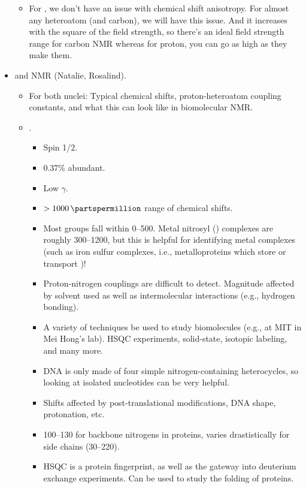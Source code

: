 \documentclass[../notes.tex]{subfiles}
\begin{document}
\begin{itemize}
\begin{itemize}
\begin{itemize}
        \end{itemize}
        \item For , we don't have an issue with chemical shift anisotropy. For almost any heteroatom (and carbon), we will have this issue. And it increases with the square of the field strength, so there's an ideal field strength range for carbon NMR whereas for proton, you can go as high as they make them.
    \end{itemize}
    \item {} and  NMR (Natalie, Rosalind).
    \begin{itemize}
        \item For both nuclei: Typical chemical shifts, proton-heteroatom coupling constants, and what this can look like in biomolecular NMR.
        \item {}.
        \begin{itemize}
            \item Spin 1/2.
            \item 0.37\% abundant.
            \item Low $\gamma$.
            \item $>\SI{1000}{\partspermillion}$ range of chemical shifts.
            \item Most groups fall within \SIrange{0}{500}{\partspermillion}. Metal nitrosyl () complexes are roughly \SIrange{300}{1200}{\partspermillion}, but this is helpful for identifying metal complexes (such as iron sulfur complexes, i.e., metalloproteins which store or transport )!
            \item Proton-nitrogen couplings are difficult to detect. Magnitude affected by solvent used as well as intermolecular interactions (e.g., hydrogen bonding).
            \item A variety of techniques be used to study biomolecules (e.g., at MIT in Mei Hong's lab). HSQC experiments, solid-state, isotopic labeling, and many more.
            \item DNA is only made of four simple nitrogen-containing heterocycles, so looking at isolated nucleotides can be very helpful.
            \item Shifts affected by post-translational modifications, DNA shape, protonation, etc.
            \item \SIrange{100}{130}{\partspermillion} for backbone nitrogens in proteins, varies drastistically for side chains (\SIrange{30}{220}{\partspermillion}).
            \item HSQC is a protein fingerprint, as well as the gateway into deuterium exchange experiments. Can be used to study the folding of proteins.

\end{itemize}
\end{itemize}
\end{itemize}
\end{document}
